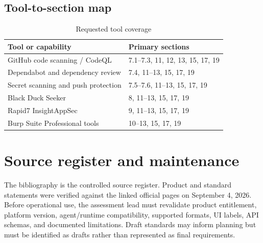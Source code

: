 \documentclass[11pt,letterpaper]{article}
\begin{document}
\subsection{Tool-to-section map}

\begin{table}[H]
\centering
\caption{Requested tool coverage}
\begin{tabularx}{\textwidth}{@{}L{1.75in}Y@{}}
\toprule
\textbf{Tool or capability} & \textbf{Primary sections} \\
\midrule
GitHub code scanning / CodeQL & 7.1--7.3, 11, 12, 13, 15, 17, 19 \\
Dependabot and dependency review & 7.4, 11--13, 15, 17, 19 \\
Secret scanning and push protection & 7.5--7.6, 11--13, 15, 17, 19 \\
Black Duck Seeker & 8, 11--13, 15, 17, 19 \\
Rapid7 InsightAppSec & 9, 11--13, 15, 17, 19 \\
Burp Suite Professional tools & 10--13, 15, 17, 19 \\
\bottomrule
\end{tabularx}
\end{table}

\section{Source register and maintenance}

The bibliography is the controlled source register. Product and standard statements were verified against the linked official pages on September 4, 2026. Before operational use, the assessment lead must revalidate product entitlement, platform version, agent/runtime compatibility, supported formats, UI labels, API schemas, and documented limitations. Draft standards may inform planning but must be identified as drafts rather than represented as final requirements.
\end{document}
